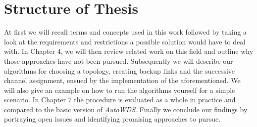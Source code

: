 \section{Structure of Thesis}
  At first we will recall terms and concepts used in this work followed by taking a look at the requirements and restrictions a possible solution would have to deal with.
  In Chapter 4, we will then review related work on this field and outline why those approaches have not been pursued.
  Subsequently we will describe our algorithms for choosing a topology, creating backup links and the successive channel assignment, ensued by the implementation of 
  the aforementioned. We will also give an example on how to run the algorithms yourself for a simple scenario.
  In Chapter 7 the procedure is evaluated as a whole in practice and compared to the basic version of \textit{AutoWDS}.
  Finally we conclude our findings by portraying open issues and identifying promising approaches to pursue.
